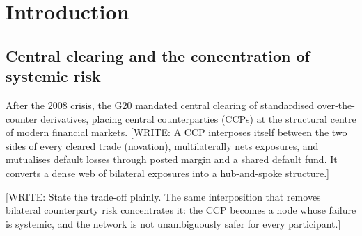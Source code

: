 \chapter{Introduction}
\label{ch:intro}

\section{Central clearing and the concentration of systemic risk}
\label{sec:intro-motivation}

After the 2008 crisis, the G20 mandated central clearing of standardised
over-the-counter derivatives, placing central counterparties (CCPs) at the
structural centre of modern financial markets.
[WRITE: A CCP interposes itself between the two sides of every cleared trade
(novation), multilaterally nets exposures, and mutualises default losses through
posted margin and a shared default fund. It converts a dense web of bilateral
exposures into a hub-and-spoke structure.] \citep{menkveld_vuillemey_2021,duffie_zhu_2011}

[WRITE: State the trade-off plainly. The same interposition that removes bilateral
counterparty risk concentrates it: the CCP becomes a node whose failure is
systemic, and the network is not unambiguously safer for every participant.]
\citep{borovkova_2013,duffie_zhu_2011}

